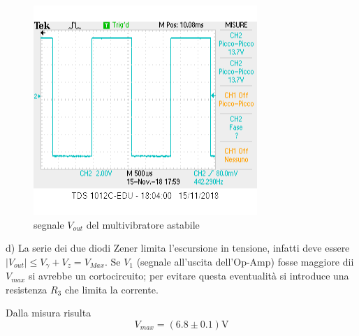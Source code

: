 \documentclass[10pt,a4paper]{article}
\begin{document}
\begin{figure}[h]
	\begin{center}
		
			\includegraphics[scale=0.8]{vout_punto2.png}
		\caption{\small segnale $V_{out}$ del multivibratore astabile }

		\label{fig:v+v-}
	\end{center}

\end{figure}


d) La serie dei due  diodi  Zener limita l'escursione in tensione, infatti deve essere $|V_{out}| \le V_{\gamma} +V_{z} = V_{Max}$.
 Se $V_{1}$ (segnale all'uscita dell'Op-Amp) fosse maggiore dii $V_{max}$ si avrebbe un cortocircuito; per evitare questa eventualità si introduce  una resistenza $R_3$ che limita la corrente.

Dalla misura risulta \[V_{max} = ( 6.8\pm 0.1) \si \volt\]
\end{document}
